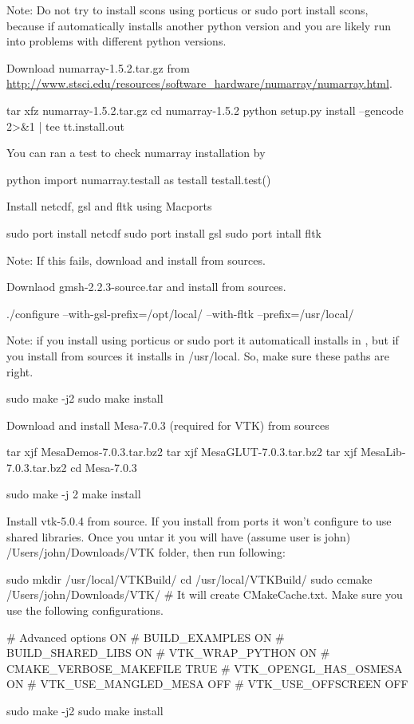 Note: Do not try to install scons using porticus or sudo port install scons, because if automatically installs another python version and you are likely run into problems with different python versions.  
 
Download numarray-1.5.2.tar.gz from \\
\url{http://www.stsci.edu/resources/software_hardware/numarray/numarray.html}. 
\begin{shellCode}
tar xfz numarray-1.5.2.tar.gz
cd numarray-1.5.2
python setup.py install --gencode  2>&1 | tee tt.install.out
\end{shellCode}

You can ran a test to check numarray installation by
\begin{shellCode}
python
import numarray.testall as testall
testall.test()
\end{shellCode}
 
Install netcdf, gsl and fltk using Macports 
\begin{shellCode}
sudo port install netcdf
sudo port install gsl
sudo port intall fltk
\end{shellCode}
Note: If this fails, download and install from sources. 
 
Downlaod gmsh-2.2.3-source.tar and install from sources.
\begin{shellCode}
./configure --with-gsl-prefix=/opt/local/  --with-fltk    --prefix=/usr/local/
\end{shellCode}
Note: if you install using porticus or sudo port  it automaticall installs in , but if you install from sources it installs in /usr/local. So, make sure these paths are right.
\begin{shellCode}
sudo make -j2
sudo make install
\end{shellCode} 
 
Download and install Mesa-7.0.3 (required for VTK) from sources
\begin{shellCode}
tar xjf MesaDemos-7.0.3.tar.bz2
tar xjf MesaGLUT-7.0.3.tar.bz2
tar xjf MesaLib-7.0.3.tar.bz2
cd Mesa-7.0.3
 
sudo make -j 2
make install
\end{shellCode} 
 
Install vtk-5.0.4 from source. If you install from ports it won't configure to use shared libraries. Once you untar it you will have (assume user is john) /Users/john/Downloads/VTK folder, then run following:
 
\begin{shellCode}
sudo mkdir /usr/local/VTKBuild/
cd /usr/local/VTKBuild/
sudo ccmake /Users/john/Downloads/VTK/ 
# It will create CMakeCache.txt. Make sure  you use the following configurations.
 
#       Advanced options			ON
#       BUILD_EXAMPLES				ON
#       BUILD_SHARED_LIBS			ON
#       VTK_WRAP_PYTHON				ON
#       CMAKE_VERBOSE_MAKEFILE			TRUE
#       VTK_OPENGL_HAS_OSMESA			ON
#       VTK_USE_MANGLED_MESA			OFF
#       VTK_USE_OFFSCREEN			OFF
 
sudo make -j2
sudo make install
\end{shellCode}
 
